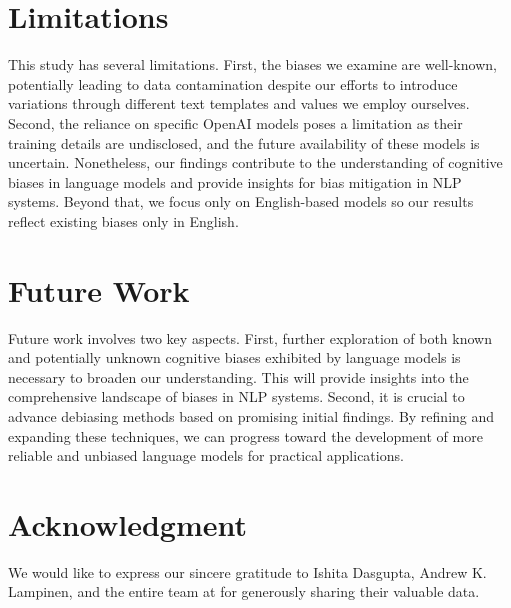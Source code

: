 \section{Limitations}

This study has several limitations.
First, the biases we examine are well-known, potentially leading to data contamination despite our efforts to introduce variations through different text templates and values we employ ourselves.
Second, the reliance on specific OpenAI models poses a limitation as their training details are undisclosed, and the future availability of these models is uncertain.
Nonetheless, our findings contribute to the understanding of cognitive biases in language models and provide insights for bias mitigation in NLP systems.
Beyond that, we focus only on English-based models so our results reflect existing biases only in English.

\section{Future Work}
Future work involves two key aspects. First, further exploration of both known and potentially unknown cognitive biases exhibited by language models is necessary to broaden our understanding.
This will provide insights into the comprehensive landscape of biases in NLP systems.
Second, it is crucial to advance debiasing methods based on promising initial findings. By refining and expanding these techniques, we can progress toward the development of more reliable and unbiased language models for practical applications.

\section*{Acknowledgment}
We would like to express our sincere gratitude to Ishita Dasgupta, Andrew K. Lampinen, and the entire team at \citet{dasgupta2022language} for generously sharing their valuable data.
